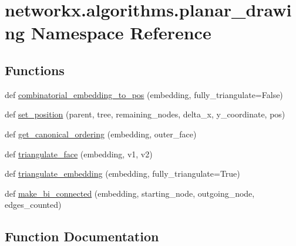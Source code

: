 \hypertarget{namespacenetworkx_1_1algorithms_1_1planar__drawing}{}\section{networkx.\+algorithms.\+planar\+\_\+drawing Namespace Reference}
\label{namespacenetworkx_1_1algorithms_1_1planar__drawing}
\subsection*{Functions}
\begin{DoxyCompactItemize}
\item 
def \hyperlink{namespacenetworkx_1_1algorithms_1_1planar__drawing_ac8d92cba8c047a320c16ffdf2684e58c}{combinatorial\+\_\+embedding\+\_\+to\+\_\+pos} (embedding, fully\+\_\+triangulate=False)
\item 
def \hyperlink{namespacenetworkx_1_1algorithms_1_1planar__drawing_a982f71be29109cd0fdaa238cf0551a23}{set\+\_\+position} (parent, tree, remaining\+\_\+nodes, delta\+\_\+x, y\+\_\+coordinate, pos)
\item 
def \hyperlink{namespacenetworkx_1_1algorithms_1_1planar__drawing_a5e561926d9c6866e89f8730fa371f029}{get\+\_\+canonical\+\_\+ordering} (embedding, outer\+\_\+face)
\item 
def \hyperlink{namespacenetworkx_1_1algorithms_1_1planar__drawing_ade5ec6675aba9215ee603d9eec914f79}{triangulate\+\_\+face} (embedding, v1, v2)
\item 
def \hyperlink{namespacenetworkx_1_1algorithms_1_1planar__drawing_a08ac4a90fdc11925daf5b94ed0789ac3}{triangulate\+\_\+embedding} (embedding, fully\+\_\+triangulate=True)
\item 
def \hyperlink{namespacenetworkx_1_1algorithms_1_1planar__drawing_a2bf4bd4ab4a56044a6fa886186b84487}{make\+\_\+bi\+\_\+connected} (embedding, starting\+\_\+node, outgoing\+\_\+node, edges\+\_\+counted)
\end{DoxyCompactItemize}


\subsection{Function Documentation}
\mbox{\label{namespacenetworkx_1_1algorithms_1_1planar__drawing_ac8d92cba8c047a320c16ffdf2684e58c}} 

